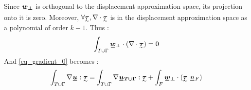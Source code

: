 \documentclass[fleqn]{article}
\begin{document}
            Since $\tensori{w}\subscript{\bm{\perp}}$ is orthogonal to the displacement approximation space, its projection onto it is zero. Moreover, $\forall \tensorii{\tau}, \nabla \cdot \tensorii{\tau}$ is in the displacement approximation space as a polynomial of order $k-1$. Thus :
            \begin{equation}
                \int_{T \cup \Gamma} \tensori{w}\subscript{\bm{\perp}} \cdot (\nabla \cdot \tensorii{\tau}) = 0
            \end{equation}
            And \eqref{eq_gradient_0} becomes :
            \begin{equation}
                \begin{aligned}
                    \label{eq_gradient_1}
                    \int_{T \cup \Gamma} \nabla \tensori{u} : \tensorii{\tau}
                    =
                    \int_{T \cup \Gamma} \nabla \tensori{u}\subscript{\bm{T \cup \Gamma}} : \tensorii{\tau}
                    +
                    \int_{F} \tensori{w}\subscript{\bm{\perp}} \cdot (\tensorii{\tau} \ \lighttensori{n}\subscript{F})
                \end{aligned}
            \end{equation}



  
\end{document}
